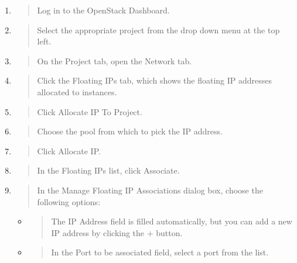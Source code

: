 \begin{enumerate}
\def\labelenumi{\arabic{enumi}.}
\item
  \begin{quote}
  Log in to the \gls{OpenStack Dashboard}.
  \end{quote}
\item
  \begin{quote}
  Select the appropriate project from the drop down menu at the top
  left.
  \end{quote}
\item
  \begin{quote}
  On the Project tab, open the Network tab.
  \end{quote}
\item
  \begin{quote}
  Click the Floating IPs tab, which shows the floating IP addresses
  allocated to instances.
  \end{quote}
\item
  \begin{quote}
  Click Allocate IP To Project.
  \end{quote}
\item
  \begin{quote}
  Choose the pool from which to pick the IP address.
  \end{quote}
\item
  \begin{quote}
  Click Allocate IP.
  \end{quote}
\item
  \begin{quote}
  In the Floating IPs list, click Associate.
  \end{quote}
\item
  \begin{quote}
  In the Manage Floating IP Associations dialog box, choose the
  following options:
  \end{quote}

  \begin{itemize}
  \item
    \begin{quote}
    The IP Address field is filled automatically, but you can add a new
    IP address by clicking the + button.
    \end{quote}
  \item
    \begin{quote}
    In the Port to be associated field, select a port from the list.
    \end{quote}
  \end{itemize}
\end{enumerate}

